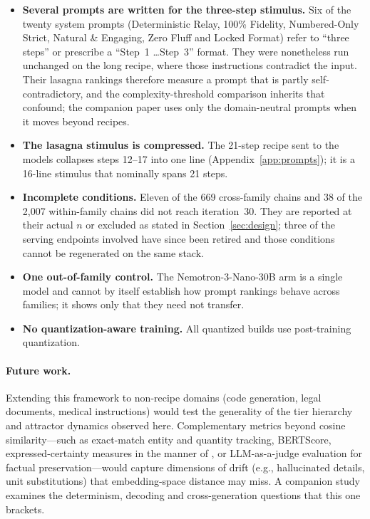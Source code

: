 \documentclass[11pt]{article}
\begin{document}
\begin{itemize}[leftmargin=*]
        contrasts rest on two or three clean chains, because the same
        conditions that separate the formats are the ones that lose chains
        to runaway. The 35B Q4\_K\_M and NVFP4 clean means, in particular,
        should be read as existence results until replicated at higher $n$.
  \item \textbf{Several prompts are written for the three-step stimulus.}
        Six of the twenty system prompts (Deterministic Relay, 100\%
        Fidelity, Numbered-Only Strict, Natural \& Engaging, Zero Fluff and
        Locked Format) refer to ``three steps'' or prescribe a
        ``Step~1 \ldots Step~3'' format. They were nonetheless run unchanged
        on the long recipe, where those instructions contradict the input.
        Their lasagna rankings therefore measure a prompt that is partly
        self-contradictory, and the complexity-threshold comparison inherits
        that confound; the companion paper uses only the domain-neutral
        prompts when it moves beyond recipes.
  \item \textbf{The lasagna stimulus is compressed.} The 21-step recipe sent
        to the models collapses steps 12--17 into one line
        (Appendix~\ref{app:prompts}); it is a 16-line stimulus that
        nominally spans 21 steps.
  \item \textbf{Incomplete conditions.} Eleven of the 669 cross-family chains
        and 38 of the 2{,}007 within-family chains did not reach
        iteration~30. They are reported at their actual $n$ or excluded as
        stated in Section~\ref{sec:design}; three of the serving endpoints
        involved have since been retired and those conditions cannot be
        regenerated on the same stack.
  \item \textbf{One out-of-family control.} The Nemotron-3-Nano-30B arm is a
        single model and cannot by itself establish how prompt rankings
        behave across families; it shows only that they need not transfer.
  \item \textbf{No quantization-aware training.} All quantized builds use
        post-training quantization.
\end{itemize}

\paragraph{Future work.}
Extending this framework to non-recipe domains (code generation, legal
documents, medical instructions) would test the generality of the tier
hierarchy and attractor dynamics observed here. Complementary metrics
beyond cosine similarity---such as exact-match entity and quantity tracking,
BERTScore, expressed-certainty measures in the manner of
\citet{belem2026certainty}, or LLM-as-a-judge evaluation for factual
preservation---would capture dimensions of drift (e.g., hallucinated details,
unit substitutions) that embedding-space distance may miss. A companion study
examines the determinism, decoding and cross-generation questions that this one
brackets.
\end{document}
